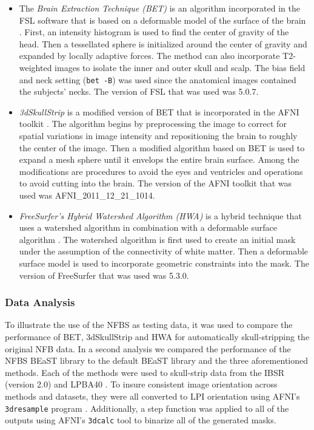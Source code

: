 \begin{itemize}
    \item The \emph{Brain Extraction Technique (BET)} is an algorithm incorporated in the FSL software that is based on a deformable model of the surface of the brain \cite{Smith2002}. First, an intensity histogram is used to find the center of gravity of the head. Then a tessellated sphere is initialized around the center of gravity and expanded by locally adaptive forces. The method can also incorporate T2-weighted images to isolate the inner and outer skull and scalp. The bias field and neck setting ({\tt bet -B}) was used since the anatomical images contained the subjects' necks. The version of FSL that was used was 5.0.7.

    \item \emph{3dSkullStrip} is a modified version of BET that is incorporated in the AFNI toolkit \cite{afni}. The algorithm begins by preprocessing the image to correct for spatial variations in image intensity and repositioning the brain to roughly the center of the image. Then a modified algorithm based on BET is used to expand a mesh sphere until it envelops the entire brain surface. Among the modifications are procedures to avoid the eyes and ventricles and operations to avoid cutting into the brain. The version of the AFNI toolkit that was used was AFNI\_2011\_12\_21\_1014.

    \item \emph{FreeSurfer's Hybrid Watershed Algorithm (HWA)} is a hybrid technique that uses a watershed algorithm in combination with a deformable surface algorithm \cite{Segonne2004}. The watershed algorithm is first used to create an initial mask under the assumption of the connectivity of white matter. Then a deformable surface model is used to incorporate geometric constraints into the mask. The version of FreeSurfer that was used was 5.3.0.
\end{itemize}



\subsubsection*{Data Analysis}

To illustrate the use of the NFBS as testing data, it was used to compare the performance of BET, 3dSkullStrip and HWA for automatically skull-stripping the original NFB data. In a second analysis we compared the performance of the NFBS BEaST library to the default BEaST library and the three aforementioned methods. Each of the methods were used to skull-strip data from the IBSR (version 2.0) and LPBA40 \cite{IBSR, lpba40}. To insure consistent image orientation across methods and datasets, they were all converted to LPI orientation using AFNI's \texttt{3dresample} program \cite{afni}. Additionally, a step function was applied to all of the outputs using AFNI's \texttt{3dcalc} tool to binarize all of the generated masks.

